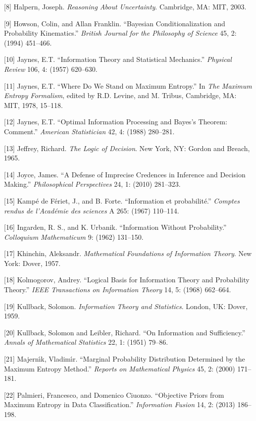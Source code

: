 \documentclass[entropy,article,submit,oneauthor,pdftex,12pt,a4paper]{mdpi}
\begin{document}
[8] Halpern, Joseph. \emph{Reasoning About Uncertainty}. Cambridge, MA: MIT, 2003.

[9] Howson, Colin, and Allan Franklin. ``Bayesian Conditionalization and Probability Kinematics.'' \emph{British Journal for the Philosophy of Science} 45, 2: (1994) 451--466.

[10] Jaynes, E.T. ``Information Theory and Statistical Mechanics.'' \emph{Physical Review} 106, 4: (1957) 620--630.

[11] Jaynes, E.T. ``Where Do We Stand on Maximum Entropy.'' In \emph{The Maximum Entropy Formalism}, edited by R.D. Levine, and M. Tribus, Cambridge, MA: MIT, 1978, 15--118.

[12] Jaynes, E.T. ``Optimal Information Processing and Bayes's Theorem: Comment.'' \emph{American Statistician} 42, 4: (1988) 280--281.

[13] Jeffrey, Richard. \emph{The Logic of Decision}. New York, NY: Gordon and Breach, 1965.

[14] Joyce, James. ``A Defense of Imprecise Credences in Inference and Decision Making.'' \emph{Philosophical Perspectives} 24, 1: (2010) 281--323.

[15] Kamp{\'e} de F{\'e}riet, J., and B. Forte. ``Information et probabilit{\'e}.'' \emph{Comptes rendus de l'Acad{\'e}mie des sciences} A 265: (1967) 110--114.

[16] Ingarden, R. S., and K. Urbanik. ``Information Without Probability.'' \emph{Colloquium Mathematicum} 9: (1962) 131--150.

[17] Khinchin, Aleksandr. \emph{Mathematical Foundations of Information Theory}. New York: Dover, 1957.

[18] Kolmogorov, Andrey. ``Logical Basis for Information Theory and Probability Theory.'' \emph{IEEE Transactions on Information Theory} 14, 5: (1968) 662--664.

[19] Kullback, Solomon. \emph{Information Theory and Statistics}. London, UK: Dover, 1959.

[20] Kullback, Solomon and Leibler, Richard. ``On Information and Sufficiency.'' \emph{Annals of Mathematical Statistics} 22, 1: (1951) 79--86.

[21] Majern{\'\i}k, Vladim{\'\i}r. ``Marginal Probability Distribution Determined by the Maximum Entropy Method.'' \emph{Reports on Mathematical Physics} 45, 2: (2000) 171--181.

[22] Palmieri, Francesco, and Domenico Ciuonzo. ``Objective Priors from Maximum Entropy in Data Classification.'' \emph{Information Fusion} 14, 2: (2013) 186--198.
\end{document}
